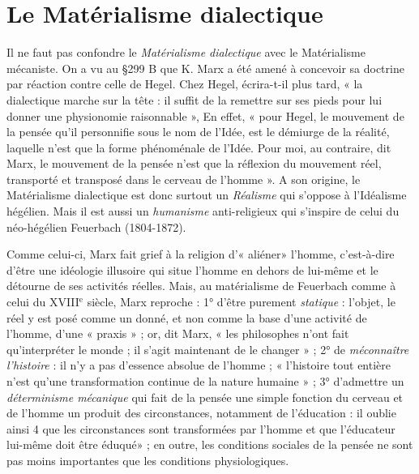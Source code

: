 \section{Le Matérialisme dialectique}%
Il ne faut pas confondre
le {\it Matérialisme dialectique} avec le Matérialisme mécaniste. On a vu
au \S 299 B que K. Marx a été amené à concevoir sa doctrine par
réaction contre celle de Hegel. Chez Hegel, écrira-t-il plus tard,
« la dialectique marche sur la tête : il suffit de la remettre sur ses
pieds pour lui donner une physionomie raisonnable », En effet, « pour
Hegel, le mouvement de la pensée qu’il personnifie sous le nom de
l’Idée, est le démiurge de la réalité, laquelle n’est que la forme phénoménale
de l’Idée. Pour moi, au contraire, dit Marx, le mouvement
de la pensée n’est que la réflexion du mouvement réel, transporté et
transposé dans le cerveau de l’homme ». A son origine, le Matérialisme
dialectique est donc surtout un {\it Réalisme} qui s’oppose à l’Idéalisme
hégélien. Mais il est aussi un {\it humanisme} anti-religieux qui s'inspire
de celui du néo-hégélien Feuerbach (1804-1872).

\vspace{0.24cm}
{\footnotesize Comme celui-ci, Marx fait grief à la religion d’« aliéner» l'homme, c’est-à-dire
d’être une idéologie illusoire qui situe l’homme en dehors de lui-même
et le détourne de ses activités réelles. Mais, au matérialisme de Feuerbach
comme à celui du {\footnotesize XVIII}$^\text{e}$ siècle, Marx reproche : 1° d’être purement {\it statique} :
l’objet, le réel y est posé comme un donné, et non comme la base d’une
activité de l’homme, d’une « praxis » ; or, dit Marx, « les philosophes n'ont
fait qu'interpréter le monde ; il s’agit maintenant de le changer » ; 2° de
{\it méconnaître l'histoire} : il n’y a pas d’essence absolue de l’homme ; « l’histoire
tout entière n’est qu’une transformation continue de la nature humaine » ;
3° d'admettre un {\it déterminisme mécanique} qui fait de la pensée une simple
fonction du cerveau et de l’homme un produit des circonstances, notamment
de l’éducation : il oublie ainsi 4 que les circonstances sont transformées
par l’homme et que l’éducateur lui-même doit être éduqué» ; en outre, les
conditions sociales de la pensée ne sont pas moins importantes que les
conditions physiologiques.}
\vspace{0.31cm}

